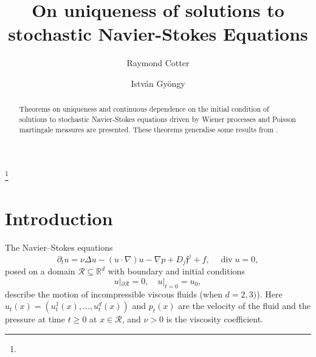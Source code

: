 \documentclass[11pt,reqno]{amsart}
\newcommand{\mysection}[1]{\section{#1}

      \setcounter{equation}{0}}
\theoremstyle{definition}
\theoremstyle{remark}
\newcommand\frf{\mathfrak{f}}
\newcommand\cR{\mathcal{R}}
\newcommand{\<}{\langle}
\renewcommand{\>}{\rangle}
\begin{document}
 
\title[On Stochastic Navier-Stokes Equations] 
{On uniqueness of solutions to stochastic Navier-Stokes Equations}

\author[R. Cotter]{Raymond Cotter}%
\thanks{}
\address{School of Mathematics and Maxwell Institute,
University of Edinburgh,
King's  Buildings,
Edinburgh, EH9 3JZ, United Kingdom}

\author[I. Gy\"ongy]{Istv\'an Gy\"ongy}
\address{School of Mathematics and Maxwell Institute,
University of Edinburgh,
King's  Buildings,
Edinburgh, EH9 3JZ, United Kingdom}


\begin{abstract}
Theorems on uniqueness and continuous dependence on the initial condition 
of solutions to stochastic Navier-Stokes equations 
driven by Wiener processes and Poisson martingale measures are presented. 
These theorems generalise some results from \cite{GK2026}.   
\end{abstract}

\maketitle





\mysection{Introduction}
The Navier--Stokes equations
\begin{equation}
                                                    \label{eq1}
\partial_t u=\nu\Delta u-(u\cdot\nabla)u-\nabla p+D_j\frf^j+f,
\quad
\operatorname{div}u=0,
\end{equation}
posed on a domain $\cR\subseteq\mathbb R^d$ with boundary and 
initial conditions 
\begin{equation} 
                                                                    \label{bin1}
u|_{\partial \cR}=0, \quad u|_{t=0}=u_0,
\end{equation} 
describe the motion of incompressible viscous fluids (when $d=2,3)$).  
Here $u_t(x)=(u^1_t(x),\dots,u^d_t(x))$ 
and $p_t(x)$ are the velocity of the fluid and the pressure at time $t\geq0$ 
at $x\in\cR$, and $\nu>0$ is the viscosity
coefficient. 
\end{document}
